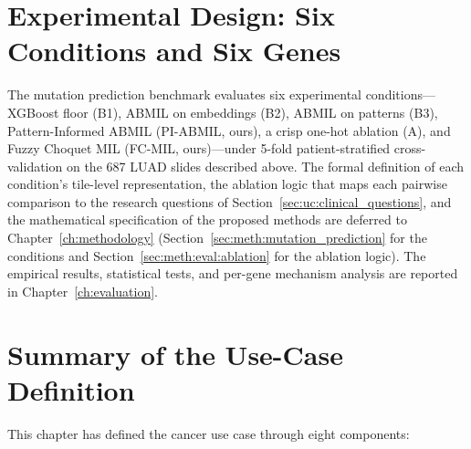 \section{Experimental Design: Six Conditions and Six Genes}
\label{sec:uc:experimental_design}

The mutation prediction benchmark evaluates six experimental
conditions---XGBoost floor (B1), ABMIL on embeddings (B2), ABMIL on
patterns (B3), Pattern-Informed ABMIL (PI-ABMIL, ours), a crisp
one-hot ablation (A), and Fuzzy Choquet MIL (FC-MIL, ours)---under
5-fold patient-stratified cross-validation on the 687 LUAD slides
described above.
The formal definition of each condition's tile-level representation,
the ablation logic that maps each pairwise comparison to the research
questions of Section~\ref{sec:uc:clinical_questions}, and the
mathematical specification of the proposed methods are deferred to
Chapter~\ref{ch:methodology}
(Section~\ref{sec:meth:mutation_prediction} for the conditions and
Section~\ref{sec:meth:eval:ablation} for the ablation logic).
The empirical results, statistical tests, and per-gene mechanism
analysis are reported in Chapter~\ref{ch:evaluation}.


\section{Summary of the Use-Case Definition}
\label{sec:uc:summary}

This chapter has defined the cancer use case through eight components:

